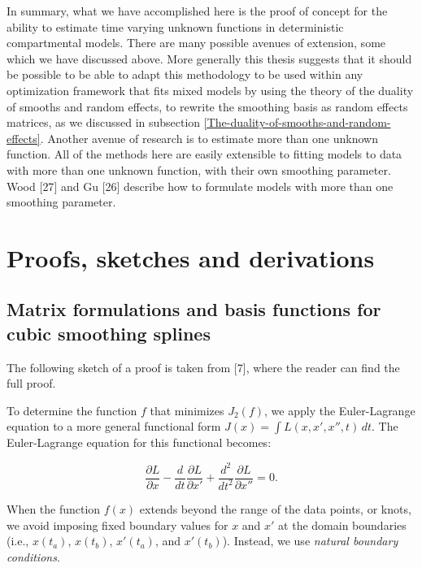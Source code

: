 \documentclass[
11pt, %
oneside, %
english, %
singlespacing, %
]{macthesis} %
\begin{document}
In summary, what we have accomplished here is the proof of concept for the ability to estimate time varying unknown functions in deterministic compartmental models. There are many possible avenues of extension, some which we have discussed above. More generally this thesis suggests that it should be possible to be able to adapt this methodology to be used within any optimization framework that fits mixed models by using the theory of the duality of smooths and random effects, to rewrite the smoothing basis as random effects matrices, as we discussed in subsection \ref{The-duality-of-smooths-and-random-effects}. Another avenue of research is to estimate more than one unknown function. All of the methods here are easily extensible to fitting models to data with more than one unknown function, with their own smoothing parameter. Wood {[}27{]} and Gu {[}26{]} describe how to formulate models with more than one smoothing parameter.

\appendix

\chapter{Proofs, sketches and derivations}\label{Appendix}

\section{Matrix formulations and basis functions for cubic smoothing splines}\label{A1}

The following sketch of a proof is taken from {[}7{]}, where the reader can find the full proof.

To determine the function \(f\) that minimizes \(J_2(f)\), we apply the Euler-Lagrange equation to a more general functional form \(J(x) = \int L(x, x', x'', t) \, dt\). The Euler-Lagrange equation for this functional becomes:

\begin{equation}
\frac{\partial L}{\partial x} - \frac{d}{dt} \frac{\partial L}{\partial x'} + \frac{d^2}{dt^2} \frac{\partial L}{\partial x''} = 0.
\label{eq:expanded Euler-Lagrange equation}
\end{equation}

When the function \(f(x)\) extends beyond the range of the data points, or knots, we avoid imposing fixed boundary values for \(x\) and \(x'\) at the domain boundaries (i.e., \(x(t_a)\), \(x(t_b)\), \(x'(t_a)\), and \(x'(t_b)\)). Instead, we use \emph{natural boundary conditions}.
\end{document}
